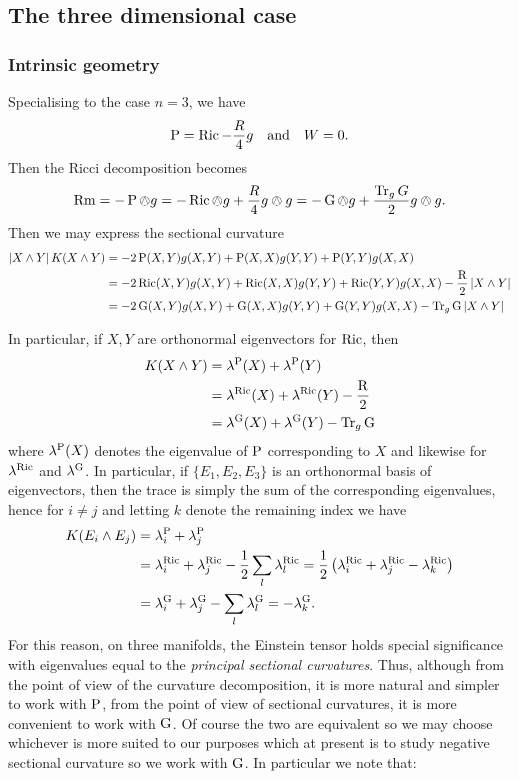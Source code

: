 \documentclass[a4paper, 12pt]{amsart}
\begin{document}
\subsection{The three dimensional case}
\label{subsec:notation_threedim}

\subsubsection{Intrinsic geometry}

Specialising to the case \(n = 3\), we have
\[
\operatorname{P} = \operatorname{Ric} - \frac{R}{4} g \quad \text{and} \quad W = 0.
\]
Then the Ricci decomposition becomes
\[
\operatorname{Rm} = -\operatorname{P} \owedge g = -\operatorname{Ric} \owedge g + \frac{R}{4} g \owedge g = -\operatorname{G} \owedge g + \frac{\operatorname{Tr}_g G}{2} g \owedge g.
\]
Then we may express the sectional curvature
\begin{align*}
\left\lvert{X \wedge Y}\right\rvert K(X \wedge Y) &= -2\operatorname{P}(X, Y) g(X, Y) + \operatorname{P}(X, X) g(Y, Y) + \operatorname{P}(Y, Y) g(X, X) \\
&= -2\operatorname{Ric}(X, Y) g(X, Y) + \operatorname{Ric}(X, X) g(Y, Y) + \operatorname{Ric}(Y, Y) g(X, X) - \frac{\operatorname{R}}{2} \left\lvert{X \wedge Y}\right\rvert \\
&= -2\operatorname{G}(X, Y) g(X, Y) + \operatorname{G}(X, X) g(Y, Y) + \operatorname{G}(Y, Y) g(X, X) - \operatorname{Tr}_g \operatorname{G} \left\lvert{X \wedge Y}\right\rvert \\
\end{align*}

In particular, if \(X, Y\) are orthonormal eigenvectors for \(\operatorname{Ric}\), then
\begin{align*}
K(X \wedge Y) &= \lambda^{\operatorname{P}}(X) + \lambda^{\operatorname{P}}(Y) \\
&= \lambda^{\operatorname{Ric}} (X) + \lambda^{\operatorname{Ric}} (Y) - \frac{\operatorname{R}}{2} \\
&= \lambda^{\operatorname{G}} (X) + \lambda^{\operatorname{G}} (Y) - \operatorname{Tr}_g \operatorname{G} \\
\end{align*}
where \(\lambda^{\operatorname{P}}(X)\) denotes the eigenvalue of \(\operatorname{P}\) corresponding to \(X\) and likewise for \(\lambda^{\operatorname{Ric}}\) and \(\lambda^{\operatorname{G}}\). In particular, if \(\{E_1, E_2, E_3\}\) is an orthonormal basis of eigenvectors, then the trace is simply the sum of the corresponding eigenvalues, hence for \(i \ne j\) and letting \(k\) denote the remaining index we have
\begin{align*}
K(E_i \wedge E_j) &= \lambda^{\operatorname{P}}_i + \lambda^{\operatorname{P}}_j \\
&= \lambda^{\operatorname{Ric}}_i  + \lambda^{\operatorname{Ric}}_j - \frac{1}{2} \sum_l \lambda^{\operatorname{Ric}}_l = \frac{1}{2}\left(\lambda^{\operatorname{Ric}}_i + \lambda^{\operatorname{Ric}}_j -\lambda^{\operatorname{Ric}}_k\right) \\
&= \lambda^{\operatorname{G}}_i + \lambda^{\operatorname{G}}_j - \sum_l \lambda^{\operatorname{G}}_l = -\lambda^{\operatorname{G}}_k.
\end{align*}
For this reason, on three manifolds, the Einstein tensor holds special significance with eigenvalues equal to the \emph{principal sectional curvatures}. Thus, although from the point of view of the curvature decomposition, it is more natural and simpler to work with \(\operatorname{P}\), from the point of view of sectional curvatures, it is more convenient to work with \(\operatorname{G}\). Of course the two are equivalent so we may choose whichever is more suited to our purposes which at present is to study negative sectional curvature so we work with \(\operatorname{G}\). In particular we note that:
\end{document}
